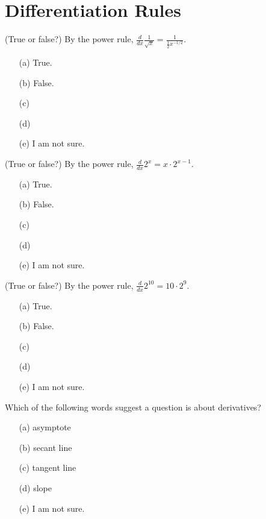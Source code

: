 \documentclass[14pt]{beamer}
\begin{document}
\section{Differentiation Rules}
\begin{frame}
  (True or false?) By the power rule, \(\frac{d}{dx} \frac{1}{\sqrt{x}} = \frac{1}{\frac{1}{2}x^{-1/2}}\).

  \medskip
  \begin{itemize} \setlength\itemsep{2ex}
    \item[(a)] True.
    \item[(b)] False.
    \item[(c)] 
    \item[(d)] 
    \item[(e)] I am not sure.
  \end{itemize} 
\end{frame}


\begin{frame}
  (True or false?) By the power rule, \(\frac{d}{dx} 2^{x} = x \cdot 2^{x-1}\).

  \medskip
  \begin{itemize} \setlength\itemsep{2ex}
    \item[(a)] True.
    \item[(b)] False.
    \item[(c)] 
    \item[(d)] 
    \item[(e)] I am not sure.
  \end{itemize} 
\end{frame}


\begin{frame}
  (True or false?) By the power rule, \(\frac{d}{dx} 2^{10} = 10 \cdot 2^{9}\).

  \medskip
  \begin{itemize} \setlength\itemsep{2ex}
    \item[(a)] True.
    \item[(b)] False.
    \item[(c)] 
    \item[(d)] 
    \item[(e)] I am not sure.
  \end{itemize} 
\end{frame}


\begin{frame}
  Which of the following words suggest a question is about derivatives?

  \medskip
  \begin{itemize} \setlength\itemsep{2ex}
    \item[(a)] asymptote
    \item[(b)] secant line
    \item[(c)] tangent line
    \item[(d)] slope
    \item[(e)] I am not sure.
  \end{itemize} 
\end{frame}
\end{document}
